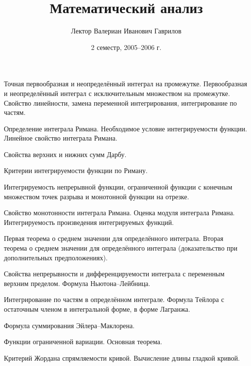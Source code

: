 \documentclass[a4paper]{article}
\title{Математический анализ}
\author{Лектор Валериан Иванович Гаврилов}
\date{2 семестр, 2005--2006 г.}
\begin{document}
\maketitle


\medskip\dmvntrail

\begin{nums}{-1}
\item Точная первообразная и неопределённый интеграл на промежутке.
Первообразная и неопределённый интеграл с исключительным множеством
на промежутке. Свойство линейности, замена переменной
интегрирования, интегрирование по частям.

\item Определение интеграла Римана. Необходимое условие
интегрируемости функции. Линейное свойство интеграла Римана.

\item Свойства верхних и нижних сумм Дарбу.

\item Критерии интегрируемости функции по Риману.

\item Интегрируемость непрерывной функции, ограниченной функции с
конечным множеством точек разрыва и монотонной функции на отрезке.

\item Свойство монотонности интеграла Римана. Оценка модуля
интеграла Римана. Интегрируемость произведения интегрируемых
функций.

\item Первая теорема о среднем значении для определённого интеграла.
Вторая теорема о среднем значении для определённого интеграла
(доказательство при дополнительных предположениях).

\item Свойства непрерывности и дифференцируемости интеграла с
переменным верхним пределом. Формула Ньютона--Лейбница.

\item Интегрирование по частям в определённом интеграле. Формула
Тейлора с остаточным членом в интегральной форме, в форме Лагранжа.

\item Формула суммирования Эйлера--Маклорена.

\item Функции ограниченной вариации. Основная теорема.

\item Критерий Жордана спрямляемости кривой. Вычисление длины
гладкой кривой.


\end{nums}
\end{document}
